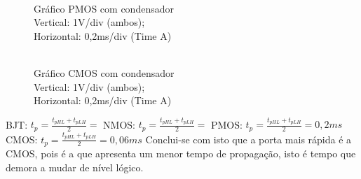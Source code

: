 \documentclass[pdftex,12pt,a4paper]{report}
\begin{document}
\begin{figure}[!htb]
  \centerline{}
  \caption{\\Gráfico PMOS com condensador \\Vertical: 1V/div (ambos); \\Horizontal: 0,2ms/div (Time A)}\label{bjt}
\endminipage\hfill
{}
  \centerline{}
  \caption{\\Gráfico CMOS com condensador \\Vertical: 1V/div (ambos); \\Horizontal: 0,2ms/div (Time A) }\label{fig:nmos}
\endminipage\hfill
\end{figure}
BJT:
$t_p = \frac{t_{pHL}+t_{pLH}}{2} = $
\newline\newline
NMOS:
$t_p = \frac{t_{pHL}+t_{pLH}}{2} = $
\newline\newline
PMOS:
$t_p = \frac{t_{pHL}+t_{pLH}}{2} = 0,2 ms$
\newline\newline
CMOS:
$t_p = \frac{t_{pHL}+t_{pLH}}{2} = 0,06ms$
\newline
Conclui-se com isto que a porta mais rápida é a CMOS, pois é a que apresenta um menor tempo de propagação, isto é tempo que demora a mudar de nível lógico.
\newline\newline
\end{document}
